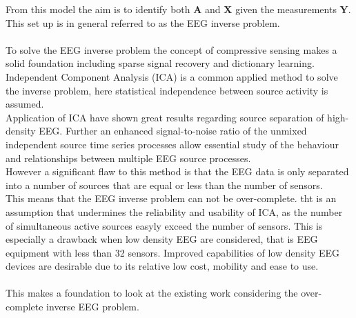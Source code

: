 From this model the aim is to identify both $\textbf{A}$ and $\textbf{X}$ given the measurements $\textbf{Y}$. This set up is in general referred to as the EEG inverse problem.  \\
\\
To solve the EEG inverse problem the concept of compressive sensing makes a solid foundation including sparse signal recovery and dictionary learning. Independent Component Analysis (ICA) is a common applied method to solve the inverse problem\cite{Scott1996}\cite{Scott1997}, here statistical independence between source activity is assumed. \\
Application of ICA have shown great results regarding source separation of high-density EEG. Further an enhanced signal-to-noise ratio of the unmixed independent source time series processes allow essential study of the behaviour and relationships between multiple EEG source processes\cite{Arnaud2012}. \\
However a significant flaw to this method is that the EEG data is only separated into a number of sources that are equal or less than the number of sensors.\\
This means that the EEG inverse problem can not be over-complete. tht is an assumption that undermines the reliability and usability of ICA, as the number of simultaneous active sources easyly  exceed the number of sensors\cite{phd2015}. This is especially a drawback when low density EEG are considered, that is EEG equipment with less than 32 sensors. Improved capabilities of low density EEG devices are desirable due to its relative low cost, mobility and ease to use. \\  
\\
This makes a foundation to look at the existing work considering the over-complete inverse EEG problem. 

